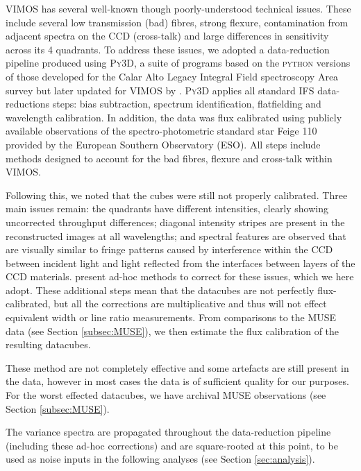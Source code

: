 \documentclass[a4paper,fleqn,usenatbib]{mnras}
\begin{document}
	VIMOS has several well-known though poorly-understood technical issues. These include several low transmission (bad) fibres, strong flexure, contamination from adjacent spectra on the CCD (cross-talk) and large differences in sensitivity across its 4 quadrants. To address these issues, we adopted a data-reduction pipeline produced using \textsc{Py3D}, a suite of programs based on the \textsc{python} versions of those developed for the Calar Alto Legacy Integral Field spectroscopy Area survey \citep[CALIFA;][]{Sanchez2012, Husemann2013} but later updated for VIMOS by \citet{Husemann2014}. \textsc{Py3D} applies all standard IFS data-reductions steps: bias subtraction, spectrum identification, flatfielding and wavelength calibration. In addition, the data was flux calibrated using publicly available observations of the spectro-photometric standard star Feige 110 provided by the European Southern Observatory (ESO). All steps include methods designed to account for the bad fibres, flexure and cross-talk within VIMOS. 

	Following this, we noted that the cubes were still not properly calibrated. Three main issues remain: the quadrants have different intensities, clearly showing uncorrected throughput differences; diagonal intensity stripes are present in the reconstructed images at all wavelengths; and spectral features are observed \citep{Jullo2008} that are visually similar to fringe patterns caused by interference within the CCD between incident light and light reflected from the interfaces between layers of the CCD materials. \citet{Lagerholm2012} present ad-hoc methods to correct for these issues, which we here adopt. These additional steps mean that the datacubes are not perfectly flux-calibrated, but all the corrections are multiplicative and thus will not effect equivalent width or line ratio measurements. From comparisons to the MUSE data (see Section \ref{subsec:MUSE}), we then estimate the flux calibration of the resulting datacubes. 

	These method are not completely effective and some artefacts are still present in the data, however in most cases the data is of sufficient quality for our purposes. For the worst effected datacubes, we have archival MUSE observations (see Section \ref{subsec:MUSE}).

	The variance spectra are propagated throughout the data-reduction pipeline (including these ad-hoc corrections) and are square-rooted at this point, to be used as noise inputs in the following analyses (see Section \ref{sec:analysis}).
\end{document}
